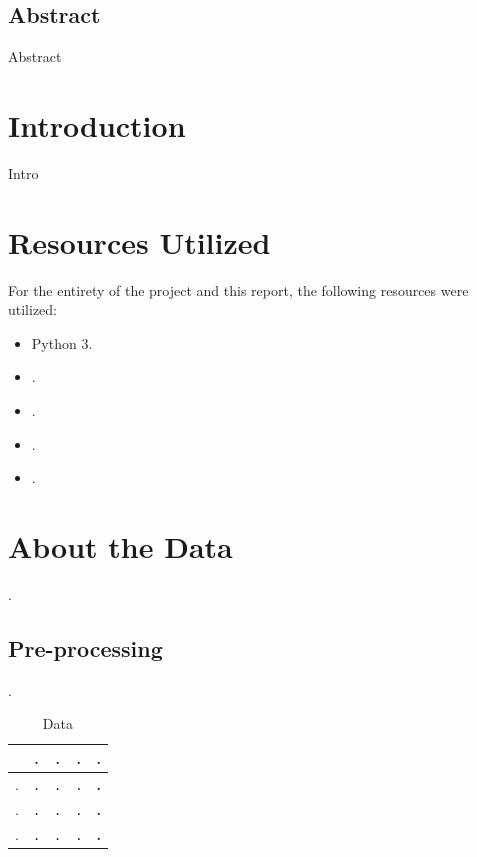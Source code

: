 \documentclass[12pt]{article}
\begin{document}
\begin{center}
\section*{Abstract}
\end{center}
Abstract

\pagebreak
\tableofcontents
\pagebreak

\section{Introduction}
Intro


\section{Resources Utilized}
For the entirety of the project and this report, the following resources were utilized:
\begin{itemize}
    \item Python 3.
    \item .
    \item .
    \item .
    \item . 
\end{itemize}

\section{About the Data}
.
\subsection{Pre-processing}
.
\begin{center}
\begin{table}[H]
\begin{tabular}{|c|c|c|c|c|} 
\hline
 & . & . & . & . \\ [0.5ex]
\hline \hline
. & \texttt{.} & \texttt{.}  & \texttt{.} & \textbf{.} \\ 
\hline
. & \texttt{.} & \texttt{.}  & \texttt{.} & \textbf{.} \\ 
\hline
. & \texttt{.} & \texttt{.}  & \texttt{.} & \textbf{.} \\ 
\hline
\end{tabular} \\
\caption{Data}
\label{table:1}
\end{table}
\end{center}
\end{document}
